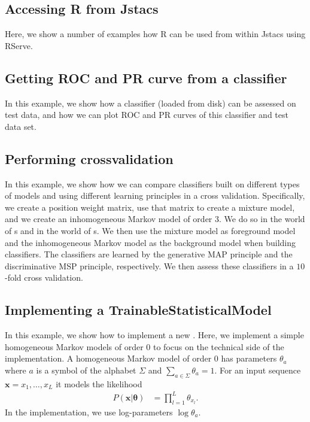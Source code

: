 \subsection{Accessing R from Jstacs}
Here, we show a number of examples how R can be used from within Jstacs using RServe.
\renewcommand{\codefile}{./recipes/RserveTest.java}
\setcounter{off}{40}

\subsection{Getting ROC and PR curve from a classifier}
In this example, we show how a classifier (loaded from disk) can be assessed on test data, and how we can plot ROC and PR curves of this classifier and test data set.
\renewcommand{\codefile}{./recipes/CurvePlotter.java}
\setcounter{off}{53}

\subsection{Performing crossvalidation}
In this example, we show how we can compare classifiers built on different types of models and using different learning principles in a cross validation. Specifically, we create a position weight matrix, use that matrix to create a mixture model, and we create an inhomogeneous Markov model of order $3$. We do so in the world of \TrainSM s and in the world of \DiffSM s. We then use the mixture model as foreground model and the inhomogeneous Markov model as the background model when building classifiers. The classifiers are learned by the generative MAP principle and the discriminative MSP principle, respectively. 
We then assess these classifiers in a $10$-fold cross validation.
\renewcommand{\codefile}{./recipes/Crossvalidation.java}
\setcounter{off}{62}

\subsection{Implementing a TrainableStatisticalModel}
In this example, we show how to implement a new \TrainSM. Here, we implement a simple homogeneous Markov models of order $0$ to focus on the technical side of the implementation. A homogeneous Markov model of order $0$ has parameters $\theta_a$ where $a$ is a symbol of the alphabet $\Sigma$ and $\sum_{a \in \Sigma} \theta_a = 1$. For an input sequence $\mathbf{x} = x_1,\ldots,x_L$ it models the likelihood
\begin{align*}
P(\mathbf{x}|\boldsymbol{\theta}) &= \prod_{l=1}^{L} \theta_{x_l}.
\end{align*}
In the implementation, we use log-parameters $\log \theta_a$.
\renewcommand{\codefile}{recipes/HomogeneousMarkovModel.java}
\setcounter{off}{35}

